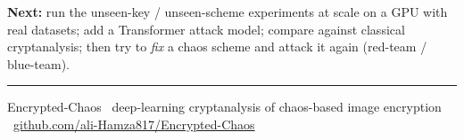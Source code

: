 \documentclass[11pt]{article}
\begin{document}
\begin{tcolorbox}[plaincard]
\textbf{Next:} run the unseen-key / unseen-scheme experiments at scale on a GPU with real
datasets; add a Transformer attack model; compare against classical cryptanalysis; then
try to \emph{fix} a chaos scheme and attack it again (red-team / blue-team).
\end{tcolorbox}

\vfill
{\color{slate}\footnotesize\hrule\vspace{4pt}
Encrypted-Chaos \textbullet\ deep-learning cryptanalysis of chaos-based image encryption
\textbullet\ \href{https://github.com/ali-Hamza817/Encrypted-Chaos}{github.com/ali-Hamza817/Encrypted-Chaos}}
\end{document}
